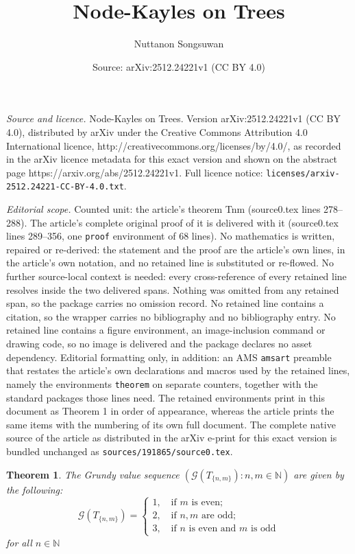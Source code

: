 \documentclass[10pt,a4paper]{amsart}
\title{Node-Kayles on Trees}
\author{Nuttanon Songsuwan}
\date{Source: arXiv:2512.24221v1 (CC BY 4.0)}
\newtheorem{theorem}{Theorem}
\begin{document}
\maketitle

\noindent\emph{Source and licence.} Node-Kayles on Trees. Version arXiv:2512.24221v1 (CC BY 4.0), distributed by arXiv under the Creative Commons Attribution 4.0 International licence, http://creativecommons.org/licenses/by/4.0/, as recorded in the arXiv licence metadata for this exact version and shown on the abstract page https://arxiv.org/abs/2512.24221v1. Full licence notice: \texttt{licenses/arxiv-2512.24221-CC-BY-4.0.txt}.\par\smallskip

\noindent\textit{Editorial scope.} Counted unit: the article's theorem Tnm (source0.tex lines 278--288). The article's complete original proof of it is delivered with it (source0.tex lines 289--356, one \texttt{proof} environment of 68 lines). No mathematics is written, repaired or re-derived: the statement and the proof are the article's own lines, in the article's own notation, and no retained line is substituted or re-flowed.  No further source-local context is needed: every cross-reference of every retained line resolves inside the two delivered spans.  Nothing was omitted from any retained span, so the package carries no omission record.  No retained line contains a citation, so the wrapper carries no bibliography and no bibliography entry.  No retained line contains a figure environment, an image-inclusion command or drawing code, so no image is delivered and the package declares no asset dependency.  Editorial formatting only, in addition: an AMS \texttt{amsart} preamble that restates the article's own declarations and macros used by the retained lines, namely the environments \texttt{theorem} on separate counters, together with the standard packages those lines need.  The retained environments print in this document as Theorem 1 in order of appearance, whereas the article prints the same items with the numbering of its own full document.  The complete native source of the article as distributed in the arXiv e-print for this exact version is bundled unchanged as \texttt{sources/191865/source0.tex}.
\begin{theorem}\label{Tnm}
	The Grundy value sequence $\left( \mathcal{G}\left(T_{\{n,m\}}\right) : n,m \in \mathbb{N} \right)$ are given by the following:
	\begin{equation*}
		\mathcal{G}\left(T_{\{n,m\}}\right) = \begin{cases}
			1,	\quad \text{if $m$ is even};\\
			2,	\quad \text{if $n,m$ are odd};\\
			3,	\quad \text{if $n$ is even and $m$ is odd}
		\end{cases}
	\end{equation*}
	for all $n \in \mathbb{N}$
\end{theorem}
\end{document}
